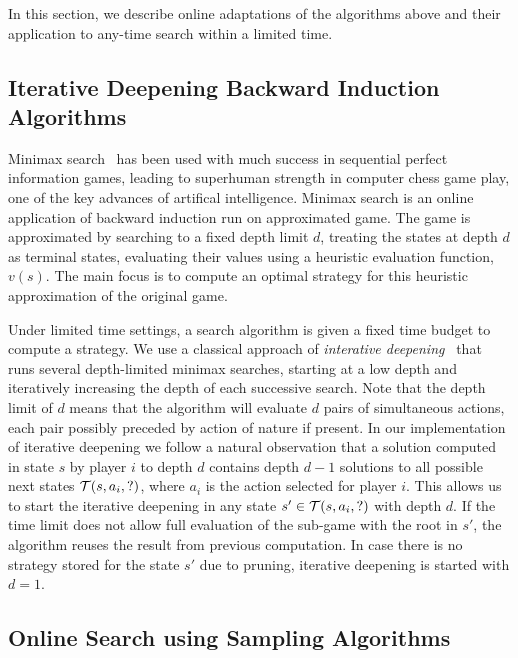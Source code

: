 In this section, we describe online adaptations of the algorithms above and their application 
to any-time search within a limited time. 

\subsection{Iterative Deepening Backward Induction Algorithms} \label{sec:idbi}

Minimax search~\cite{AIbook} has been used with much success in sequential perfect information games, 
leading to superhuman strength in computer chess game play, one of the key advances of artifical 
intelligence. 
Minimax search is an online application of backward induction run on approximated game. 
The game is approximated by searching to a fixed depth limit $d$, treating the states at depth $d$
as terminal states, evaluating their values using a heuristic evaluation function, $v(s)$. 
The main focus is to compute an optimal strategy for this heuristic approximation of the original game. 

Under limited time settings, a search algorithm is given a fixed time budget to compute a strategy. 
We use a classical approach of {\it interative deepening}~\cite{AIbook} that runs several depth-limited 
minimax searches, starting at a low depth and iteratively increasing the depth of each successive search. 
Note that the depth limit of $d$ means that the algorithm will evaluate $d$ pairs of simultaneous actions, each pair possibly preceded by action of nature if present.  
In our implementation of iterative deepening we follow a natural observation that a solution computed in state $s$ by player $i$ to depth $d$ contains depth $d-1$ solutions to all possible next states $\mathcal{T}(s,a_i,?)$, where $a_i$ is the action selected for player $i$.
This allows us to start the iterative deepening in any state $s' \in \mathcal{T}(s,a_i,?)$ with depth $d$.
If the time limit does not allow full evaluation of the sub-game with the root in $s'$, the algorithm reuses the result from previous computation.
In case there is no strategy stored for the state $s'$ due to pruning, iterative deepening is started with $d = 1$.

\subsection{Online Search using Sampling Algorithms}

